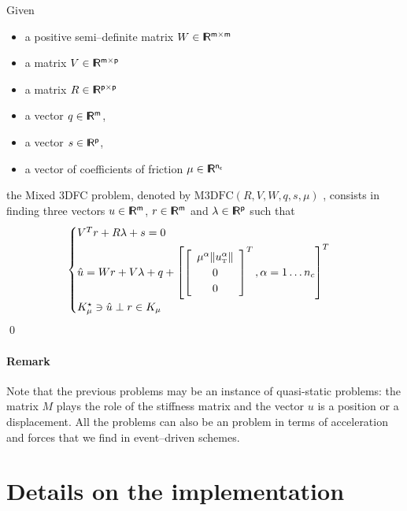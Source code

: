 \documentclass[twoside]{article}
\def\t{{\hbox{\tiny{T}}}}
\newcommand{\RR}{\ensuremath{\rm\sf I\!R}}
\begin{document}
\begin{definition}
  Given
  \begin{itemize}
    \item a positive semi--definite matrix  ${W} \in \RR^{m \times m}$
    \item a matrix  ${V} \in \RR^{m \times p}$
    \item a matrix  ${R} \in \RR^{p \times p}$
     \item a vector $q \in \RR^{m}$,
     \item a vector $s \in \RR^{p}$,
    \item a vector of coefficients of friction $\mu \in \RR^{n_c}$
  \end{itemize}
 the  Mixed 3DFC problem, denoted by $\mathrm{M3DFC}(R,V,W,q,s,\mu)$ , consists in finding three vectors $u\in\RR^m$, $r\in \RR^m$ and $\lambda \in \RR^p$  such that
\begin{equation}\label{eq:mfc3d}
  \begin{cases}
    V^T {r} + R \lambda + s = 0 \\[1mm]
    \hat u = W {r}    + V\lambda  + q +\left[
      \left[\begin{array}{c}
        \mu^\alpha \|u^\alpha_\t\|\\
        0 \\
        0
      \end{array}\right]^T, \alpha = 1 \ldots n_c
\right]^T \\[1mm]
   K^\star_{\mu} \ni {\hat u} \perp r \in K_{\mu}
  \end{cases}
\end{equation}
\qed
\end{definition}

\paragraph{Remark}
Note that the previous problems may be an instance of quasi-static problems: the matrix $M$ plays the role of the stiffness matrix and the vector $u$ is a position or a displacement. All the problems can also be an problem in terms of acceleration and forces that we find in event--driven schemes.


\section{Details on the  implementation}
\end{document}
